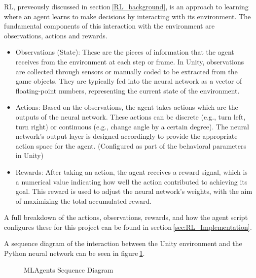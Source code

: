 RL, preveously discussed in section$~$\ref{RL_background}, is an approach to learning where an agent learns to make decisions by interacting with its environment. The fundamental components of this interaction with the environment are observations, actions and rewards.
\begin{itemize}
    \item Observations (State): These are the pieces of information that the agent receives from the environment at each step or frame. In Unity, observations are collected through sensors or manually coded to be extracted from the game objects. They are typically fed into the neural network as a vector of floating-point numbers, representing the current state of the environment.
    \item Actions: Based on the observations, the agent takes actions which are the outputs of the neural network. These actions can be discrete (e.g., turn left, turn right) or continuous (e.g., change angle by a certain degree). The neural network's output layer is designed accordingly to provide the appropriate action space for the agent. (Configured as part of the behavioral parameters in Unity)
    \item Rewards: After taking an action, the agent receives a reward signal, which is a numerical value indicating how well the action contributed to achieving its goal. This reward is used to adjust the neural network's weights, with the aim of maximizing the total accumulated reward.
\end{itemize}
A full breakdown of the actions, observations, rewards, and how the agent script configures these for this project can be found in section$~$\ref{sec:RL_Implementation}.

A sequence diagram of the interaction between the Unity environment and the Python neural network can be seen in figure$~$\ref{MLAgents_Seq_Diagram}.

\begin{figure}[h]
    \centering
    \caption{MLAgents Sequence Diagram}\label{MLAgents_Seq_Diagram}
\end{figure}

